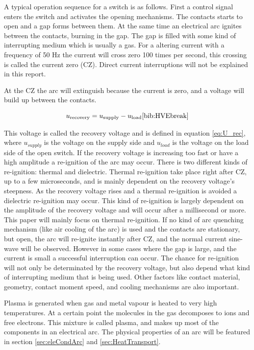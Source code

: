 \documentclass[10pt,a4paper,twoside]{article}
\begin{document}
A typical operation sequence for a switch is as follows. First a control signal enters the switch and activates the opening mechanisms. The contacts starts to open and a gap forms between them. At the same time an electrical arc ignites between the contacts, burning in the gap. The gap is filled with some kind of interrupting medium which is usually a gas. For a altering current with a frequency of 50 Hz the current will cross zero 100 times per second, this crossing is called the current zero (CZ). Direct current interruptions will not be explained in this report. 

At the CZ the arc will extinguish because the current is zero, and a voltage will build up between the contacts.

\begin{equation} \label{eq:U_rec}
u_\mathrm{{recovery}}=u_\mathrm{{supply}}-u_\mathrm{{load}} \cite{bib:HVEbreak}
\end{equation} 

 This voltage is called the recovery voltage and is defined in equation \eqref{eq:U_rec}, where $u_{supply}$ is the voltage on the supply side and $u_{load}$ is the voltage on the load side of the open switch. If the recovery voltage is increasing too fast or have a high amplitude a re-ignition of the arc may occur. There is two different kinds of re-ignition: thermal and dielectric. Thermal re-ignition take place right after CZ, up to a few microseconds, and is mainly dependent on the recovery voltage's steepness. As the recovery voltage rises and a thermal re-ignition is avoided a dielectric re-ignition may occur. This kind of re-ignition is largely dependent on the amplitude of the recovery voltage and will occur after a millisecond or more. This paper will mainly focus on thermal re-ignition. If no kind of arc quenching mechanism (like air cooling of the arc) is used and the contacts are stationary, but open, the arc will re-ignite instantly after CZ, and the normal current sine-wave will be observed. However in some cases where the gap is large, and the current is small a successful interruption can occur. The chance for re-ignition will not only be determinated by the recovery voltage, but also depend what kind of interrupting medium that is being used. Other factors like contact material, geometry, contact moment speed, and cooling mechanisms are also important.

Plasma is generated when gas and metal vapour is heated to very high temperatures. At a certain point the molecules in the gas decomposes to ions and free electrons. This mixture is called plasma, and makes up most of the components in an electrical arc. The physical properties of an arc will be featured in section \ref{sec:eleCondArc} and \ref{sec:HeatTransport}. 
\end{document}
